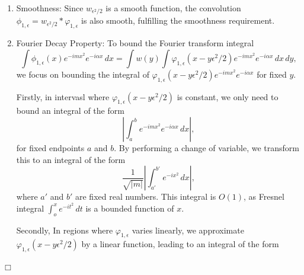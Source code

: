 \documentclass{article}
\newenvironment{proof}{\noindent {\bf Proof:}}{$\Box$ \vspace{2 ex}}
\begin{document}
\begin{proof}
\begin{enumerate}
\begin{equation*}
\phi_{1, \epsilon}(x) = w_{\epsilon^2 / 2} * \varphi_{1, \epsilon}(x) = \int_{\mathbb{R}} \varphi_{1, \epsilon}(x - y \epsilon^2 / 2) w(y) \, dy = (1 - \epsilon) \int_{\mathbb{R}} w(y) \, dy = 1 - \epsilon. 
\end{equation*}
This confirms that $\phi_{1, \epsilon}(x) = 1 - \epsilon$ within the specified interval, ensuring that $|\phi_{1, \epsilon}(x) - \chi_{(-1,1)}(x)| \leq \epsilon$ everywhere except within two intervals of size $O(\epsilon)$.

\item Smoothness: Since $w_{\epsilon^2 / 2}$ is a smooth function, the convolution $\phi_{1, \epsilon} = w_{\epsilon^2 / 2} * \varphi_{1, \epsilon}$ is also smooth, fulfilling the smoothness requirement.

\item Fourier Decay Property: To bound the Fourier transform integral \begin{equation*} \int \phi_{1, \epsilon}(x) e^{-imx^2} e^{-i\alpha x} \, dx = \int w(y) \int \varphi_{1, \epsilon}(x - y \epsilon^2 / 2) e^{-imx^2} e^{-i\alpha x} \, dx \, dy, \end{equation*} 
we focus on bounding the integral of $ \varphi_{1, \epsilon}(x - y \epsilon^2 / 2) e^{-imx^2} e^{-i\alpha x} $ for fixed $ y $.

Firstly, in intervasl where $ \varphi_{1, \epsilon}(x-y\epsilon^2/2) $ is constant, we only need to bound an integral of the form
\begin{equation*} 
\left| \int_a^b e^{-imx^2} e^{-i\alpha x} \, dx \right|, 
\end{equation*} for fixed endpoints $a$ and $b$. By performing a change of variable, we transform this to an integral of the form
\begin{equation*} 
\frac{1}{\sqrt{|m|}}\left|\int_{a'}^{b'} e^{-ix^2} \, dx \right|, 
\end{equation*}
where $a'$ and $b'$ are fixed real numbers. This integral is $O(1)$, as Fresnel integral $\int_{o}^{x} e^{-it^2} \, dt$ is a bounded function of $x$.

Secondly, In regions where $\varphi_{1, \epsilon}$ varies linearly, we approximate $\varphi_{1, \epsilon}(x - y \epsilon^2 / 2)$ by a linear function, leading to an integral of the form 


\end{enumerate}
\end{proof}
\end{document}
